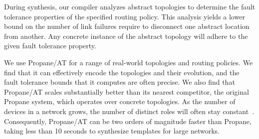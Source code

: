 \documentclass[numbers, 10pt, preprint]{sigplanconf}
\newcommand{\sysname}{{\text{}\small \sf Propane/AT}\xspace}
\newcommand{\Propane}{{\text{}\small \sf Propane}\xspace}
\begin{document}
During synthesis, our compiler analyzes abstract topologies to determine
the fault tolerance properties of the specified routing policy.  This analysis yields a lower  
bound on the number of link failures require to disconnect one abstract location from another. 
Any concrete instance of the abstract topology will adhere to the given fault tolerance property.




We use \sysname for a range of real-world topologies and routing policies. We find that it can effectively encode the topologies and their evolution, and the fault tolerance bounds that it computes are often precise. 
We also find that \sysname scales substantially better than its nearest competitor, the original \Propane system, 
which operates over concrete topologies. As the number of devices in a
network grows, the number of distinct roles will often stay constant~\cite{surgery}.
Consequently, \sysname can be two orders of magnitude
faster than \Propane, taking less than 10 seconds to synthesize templates for large  networks.
\end{document}
